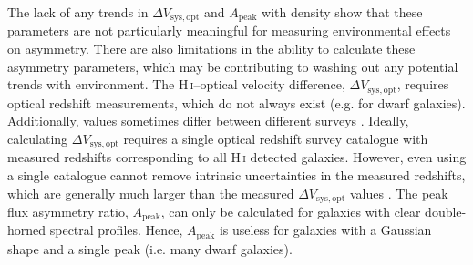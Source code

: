 \documentclass[fleqn,usenatbib]{mnras}
\begin{document}
The lack of any trends in $\Delta V_{\mathrm{sys,opt}}$ and $A_{\mathrm{peak}}$ with density show that these parameters are not particularly meaningful for measuring environmental effects on asymmetry. There are also limitations in the ability to calculate these asymmetry parameters, which may be contributing to washing out any potential trends with environment. The H\,\textsc{i}--optical velocity difference, $\Delta V_{\mathrm{sys,opt}}$, requires optical redshift measurements, which do not always exist (e.g. for dwarf galaxies). Additionally, values sometimes differ between different surveys \citep[e.g. the optical redshifts for VIVA galaxies from SDSS do not all agree with the values taken from NED quoted in][]{Chung2009}. Ideally, calculating $\Delta V_{\mathrm{sys,opt}}$ requires a single optical redshift survey catalogue with measured redshifts corresponding to all H\,\textsc{i} detected galaxies. However, even using a single catalogue cannot remove intrinsic uncertainties in the measured redshifts, which are generally much larger than the measured $\Delta V_{\mathrm{sys,opt}}$ values \citep[e.g. $\Delta cz\sim46$\,km\,s$^{-1}$ for 6dFGS,][]{Jones2009}. The peak flux asymmetry ratio, $A_{\mathrm{peak}}$, can only be calculated for galaxies with clear double-horned spectral profiles. Hence, $A_{\mathrm{peak}}$ is useless for galaxies with a Gaussian shape and a single peak (i.e. many dwarf galaxies). 
\end{document}
